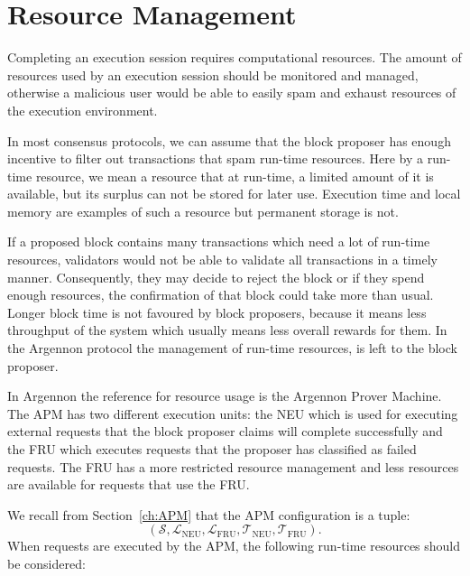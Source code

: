 \section{Resource Management}\label{sec:res-man}

Completing an execution session requires computational resources. The amount of resources used by an execution session
should be monitored and managed, otherwise a malicious user would be able to easily spam and exhaust resources of the
execution environment.

In most consensus protocols, we can assume that the block proposer has enough incentive to filter out transactions
that spam run-time resources. Here by a run-time resource, we mean a resource that at run-time, a limited amount
of it is available, but its surplus can not be stored for later use. Execution time and local memory are
examples of such a resource but permanent storage is not.

If a proposed block contains many transactions which need a lot of run-time resources, validators would not
be able to validate all transactions in a timely manner. Consequently, they may decide to reject the block or if they
spend enough resources, the confirmation of that block could take more than usual. Longer block time is not
favoured by block proposers, because it means less throughput of the system which usually means less overall rewards
for them. In the Argennon protocol the management of run-time resources, is left to the block proposer.

In Argennon the reference for resource usage is the Argennon Prover Machine. The APM has two different execution
units: the NEU which is used for executing external requests that the block proposer claims will complete
successfully and the FRU which executes requests that the proposer has classified as failed requests. The FRU has a
more restricted resource management and less resources are available for requests that use the FRU.

We recall from Section~\ref{ch:APM} that the APM configuration is a tuple:
\[
(\mathcal{S},\mathcal{L}_{\text{NEU}},\mathcal{L}_{\text{FRU}},\mathcal{T}_{\text{NEU}},\mathcal{T}_{\text{FRU}}).
\]
When requests are executed by the APM, the following run-time resources should be considered:

